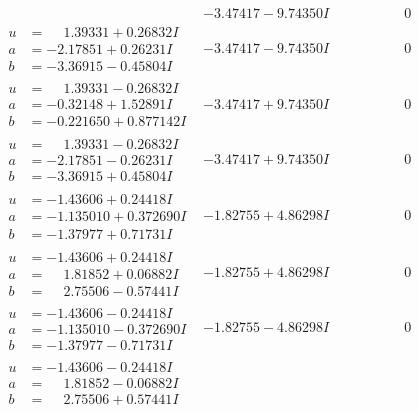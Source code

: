\documentclass[1p]{elsarticle_modified}
\theoremstyle{definition}
\begin{document}
$$\begin{array}{c|c|c}
 & -3.47417 - 9.74350 I & \phantom{-0.000000 } 0 \\ \hline\begin{aligned}
u &= \phantom{-}1.39331 + 0.26832 I \\
a &= -2.17851 + 0.26231 I \\
b &= -3.36915 - 0.45804 I\end{aligned}
 & -3.47417 - 9.74350 I & \phantom{-0.000000 } 0 \\ \hline\begin{aligned}
u &= \phantom{-}1.39331 - 0.26832 I \\
a &= -0.32148 + 1.52891 I \\
b &= -0.221650 + 0.877142 I\end{aligned}
 & -3.47417 + 9.74350 I & \phantom{-0.000000 } 0 \\ \hline\begin{aligned}
u &= \phantom{-}1.39331 - 0.26832 I \\
a &= -2.17851 - 0.26231 I \\
b &= -3.36915 + 0.45804 I\end{aligned}
 & -3.47417 + 9.74350 I & \phantom{-0.000000 } 0 \\ \hline\begin{aligned}
u &= -1.43606 + 0.24418 I \\
a &= -1.135010 + 0.372690 I \\
b &= -1.37977 + 0.71731 I\end{aligned}
 & -1.82755 + 4.86298 I & \phantom{-0.000000 } 0 \\ \hline\begin{aligned}
u &= -1.43606 + 0.24418 I \\
a &= \phantom{-}1.81852 + 0.06882 I \\
b &= \phantom{-}2.75506 - 0.57441 I\end{aligned}
 & -1.82755 + 4.86298 I & \phantom{-0.000000 } 0 \\ \hline\begin{aligned}
u &= -1.43606 - 0.24418 I \\
a &= -1.135010 - 0.372690 I \\
b &= -1.37977 - 0.71731 I\end{aligned}
 & -1.82755 - 4.86298 I & \phantom{-0.000000 } 0 \\ \hline\begin{aligned}
u &= -1.43606 - 0.24418 I \\
a &= \phantom{-}1.81852 - 0.06882 I \\
b &= \phantom{-}2.75506 + 0.57441 I\end{aligned}

\end{array}$$
\end{document}
